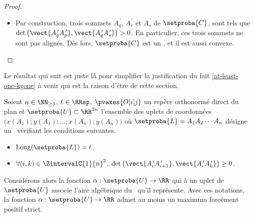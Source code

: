 \begin{proof}
\begin{itemize}
        \item Par construction, trois sommets  $A^{\,\prime}_q$, $A^{\,\prime}_r$ et $A^{\,\prime}_s$ de $\setproba{C}$, sont tels que $\det \big( \vect{A^{\,\prime}_q A^{\,\prime}_{p}}, \vect{A^{\,\prime}_q A^{\,\prime}_s} \big) > 0$. 
        En particulier, ces trois sommets  ne sont pas alignés.
        Dès lors, $\setproba{C}$ est un \kgone, et il est aussi convexe. 
    \end{itemize}
\end{proof}




%

Le résultat qui suit est juste là pour simplifier la justification du fait \ref{at-least-one-kgone} à venir qui est la raison d'être de cette section.


\begin{fact} \label{at-least-one-ncycle}
    Soient $n \in \NN_{\geq3}$,
    $\ell \in \RRsp$,
    $\pvaxes{O | i | j}$ un repère orthonormé direct du plan
    et
    $\setproba{U} \subset \RR^{2n}$ l'ensemble des uplets de coordonnées $\big( x(A_1) ; y(A_1) ; \dots ; x(A_n) ; y(A_n) \big)$ où $\setproba{L} = A_1 A_2 \cdots A_n$ désigne un \ncycle\ vérifiant les conditions suivantes.
    \begin{itemize}
        \item $\cyclelen{\setproba{L}} = \ell$.
    
        \item $\forall (i, k) \in \ZintervalC{1}{n}^2$,
		$\det \big( \vect{A^{\,\prime}_i A^{\,\prime}_{i+1}}, \vect{A^{\,\prime}_i A^{\,\prime}_k} \big) \geq 0$.
    \end{itemize}
    
    Considérons alors la fonction $\alpha: \setproba{U} \rightarrow \RR$ qui à un uplet de $\setproba{U}$ associe l'aire algébrique du \ncycle\ qu'il représente.
	Avec ces notations, la fonction $\alpha: \setproba{U} \rightarrow \RR$ admet au moins un maximum forcément positif strict.
\end{fact}


